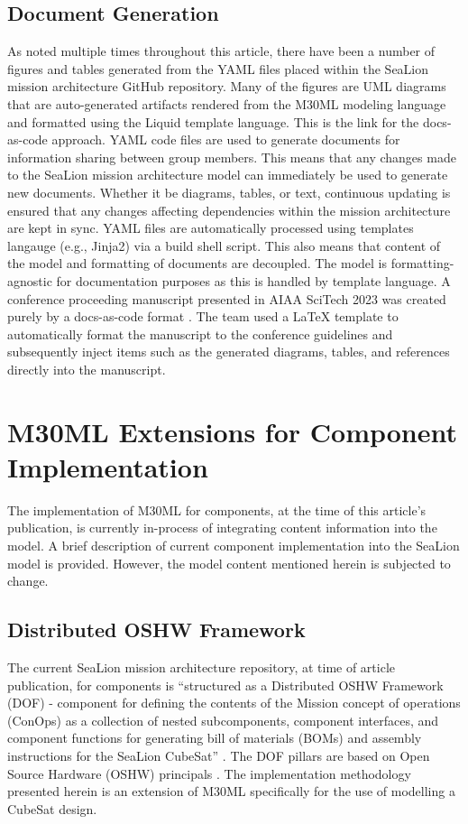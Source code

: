 \documentclass[journal,article,submit,pdftex,moreauthors]{Definitions/mdpi}
\begin{document}
\subsection{Document Generation}
As noted multiple times throughout this article, there have been a number of figures and tables generated from the YAML files placed within the SeaLion mission architecture GitHub repository.  Many of the figures are UML diagrams that are auto-generated artifacts rendered from the M30ML modeling language and formatted using the Liquid template language.  This is the link for the docs-as-code approach.  YAML code files are used to generate documents for information sharing between group members.  This means that any changes made to the SeaLion mission architecture model can immediately be used to generate new documents.  Whether it be diagrams, tables, or text, continuous updating is ensured that any changes affecting dependencies within the mission architecture are kept in sync.  YAML files are automatically processed using templates langauge (e.g., Jinja2) via a build shell script.  This also means that content of the model and formatting of documents are decoupled.  The model is formatting-agnostic for documentation purposes as this is handled by template language.  A conference proceeding manuscript presented in AIAA SciTech 2023 was created purely by a docs-as-code format \cite{scitech_proceeding}.  The team used a LaTeX template to automatically format the manuscript to the conference guidelines and subsequently inject items such as the generated diagrams, tables, and references directly into the manuscript.

\section{M30ML Extensions for Component Implementation}
The implementation of M30ML for components, at the time of this article's publication, is currently in-process of integrating content information into the model.  A brief description of current component implementation into the SeaLion model is provided.  However, the model content mentioned herein is subjected to change.

\subsection{Distributed OSHW Framework}
  The current SeaLion mission architecture repository, at time of article publication, for components is “structured as a Distributed OSHW Framework (DOF) - component for defining the contents of the Mission concept of operations (ConOps) as a collection of nested subcomponents, component interfaces, and component functions for generating bill of materials (BOMs) and assembly instructions for the SeaLion CubeSat” \cite{sealion_mission_architecture}.  The DOF pillars are based on Open Source Hardware (OSHW) principals \cite{mach30_git}.  The implementation methodology presented herein is an extension of M30ML specifically for the use of modelling a CubeSat design.  
  
\end{document}
